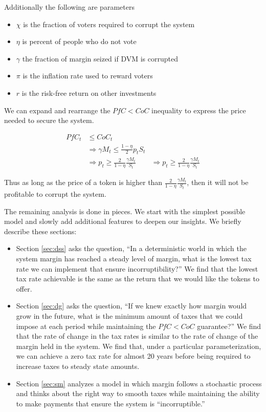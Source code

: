\documentclass[12pt]{article}
\begin{document}
  Additionally the following are parameters

  \begin{itemize}
    \item $\chi$ is the fraction of voters required to corrupt the system
    \item $\eta$ is percent of people who do not vote
    \item $\gamma$ the fraction of margin seized if DVM is corrupted
    \item $\pi$ is the inflation rate used to reward voters
    \item $r$ is the risk-free return on other investments
  \end{itemize}

  We can expand and rearrange the $PfC < CoC$ inequality to express the price needed to secure the
  system.

  \begin{align*}
    PfC_t &\leq CoC_t \\
    &\Rightarrow \gamma M_t \leq \frac{1 - \eta}{2} p_t S_t \\
    &\Rightarrow p_t \geq \frac{2}{1 - \eta} \frac{\gamma M_t}{S_t}
    &\Rightarrow p_t \geq \frac{2}{1 - \eta} \frac{\gamma M_t}{S_t}
  \end{align*}

  Thus as long as the price of a token is higher than $\frac{2}{1 - \eta} \frac{\gamma M_t}{S_t}$,
  then it will not be profitable to corrupt the system.

  The remaining analysis is done in pieces. We start with the simplest possible model and slowly
  add additional features to deepen our insights. We briefly describe these sections:

  \begin{itemize}
    \item Section \ref{sec:dss} asks the question, ``In a deterministic world in which the system
          margin has reached a steady level of margin, what is the lowest tax rate we can implement
          that ensure incorruptibility?'' We find that the lowest tax rate achievable is the same
          as the return that we would like the tokens to offer.
    \item Section \ref{sec:dg} asks the question, ``If we knew exactly how margin would grow
          in the future, what is the minimum amount of taxes that we could impose at each
          period while maintaining the $PfC < CoC$ guarantee?'' We find that the rate of change in
          the tax rates is similar to the rate of change of the margin held in the system. We find
          that, under a particular parameterization, we can achieve a zero tax rate for almost 20
          years before being required to increase taxes to steady state amounts.
    \item Section \ref{sec:sm} analyzes a model in which margin follows a stochastic process and
          thinks about the right way to smooth taxes while maintaining the ability to make payments
          that ensure the system is ``incorruptible.''
  \end{itemize}
\end{document}

